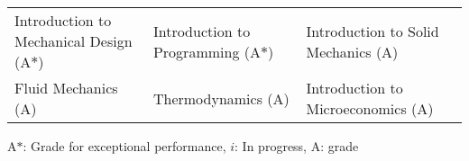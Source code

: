 
\begin{tabular*}{\textwidth}{l l l l}
  Introduction to Mechanical Design (A$*$) & Introduction to Programming (A$*$)  & Introduction to Solid Mechanics (A) \\
  Fluid Mechanics (A) & Thermodynamics (A) & Introduction to Microeconomics (A) \\
\end{tabular*}
{\footnotesize
    {A$*$: Grade for exceptional performance, $i$: In progress, A: grade}
}
